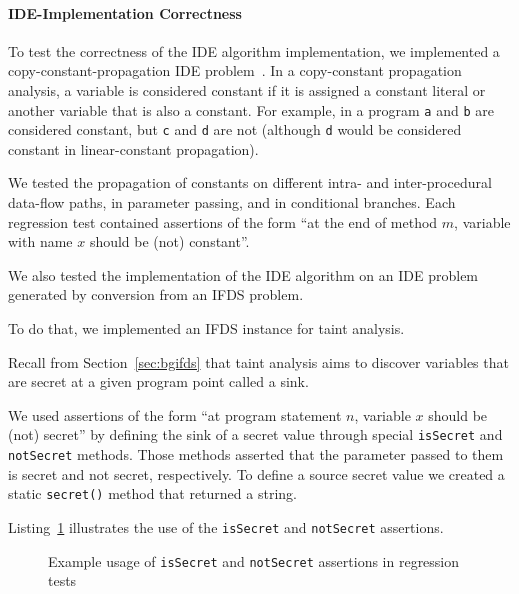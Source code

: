 \begin{mdelete}
\paragraph{IDE-Implementation Correctness}
To test the correctness of the IDE algorithm implementation, we implemented a copy-constant-propagation IDE problem~\cite{sagiv1996precise}.
In a copy-constant propagation analysis, a variable is considered constant if it is assigned a constant literal or another variable that is also a constant. For example, in a program
\texttt a and \texttt b are considered constant, but \texttt c and \texttt d are not (although \texttt d would be considered constant in linear-constant propagation).

We tested the propagation of constants on different intra- and inter-procedural data-flow paths, in parameter passing,
and in conditional branches. Each regression test contained assertions of the form ``at the end of method $m$, variable with name $x$ should be (not) constant''.

We also tested the implementation of the IDE algorithm on an IDE problem generated by conversion from an IFDS problem.

To do that, we implemented an IFDS instance for taint analysis.

Recall from Section~\ref{sec:bgifds} that taint analysis aims to discover variables that are secret at a given program point called a sink.

We used assertions of the form ``at program statement $n$, variable $x$ should be (not) secret'' by defining the sink of a secret value through special \verb'isSecret' and \verb'notSecret' methods.
Those methods asserted that the parameter passed to them is secret and not secret, respectively.
To define a source secret value we created a static \verb'secret()' method that returned a string. 

\begin{example}
  Listing~\ref{list:assertions} illustrates the use of the \verb'isSecret' and \verb'notSecret' assertions.
\begin{figure}
  \centering
  \begin{minipage}{\textwidth}
  \end{minipage}
  \caption{Example usage of \texttt{isSecret} and \texttt{notSecret} assertions in regression tests}
  \label{list:assertions}
\end{figure}
\end{example}


\end{mdelete}
